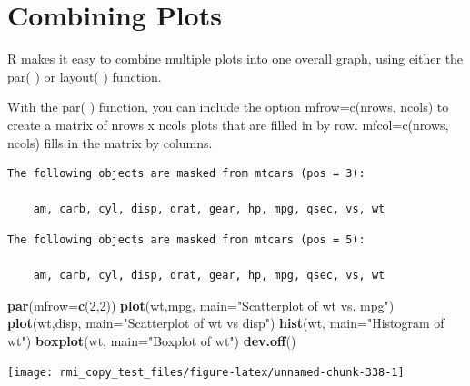 \documentclass[]{book}
\newenvironment{Shaded}{\begin{snugshade}}{\end{snugshade}}
\newcommand{\CommentTok}[1]{\textcolor[rgb]{0.56,0.35,0.01}{\textit{#1}}}
\newcommand{\DataTypeTok}[1]{\textcolor[rgb]{0.13,0.29,0.53}{#1}}
\newcommand{\DecValTok}[1]{\textcolor[rgb]{0.00,0.00,0.81}{#1}}
\newcommand{\KeywordTok}[1]{\textcolor[rgb]{0.13,0.29,0.53}{\textbf{#1}}}
\newcommand{\NormalTok}[1]{#1}
\newcommand{\StringTok}[1]{\textcolor[rgb]{0.31,0.60,0.02}{#1}}
\theoremstyle{definition}
\theoremstyle{definition}
\theoremstyle{definition}
\theoremstyle{remark}
\begin{document}
\hypertarget{combining-plots}{%
\section{Combining Plots}\label{combining-plots}}

R makes it easy to combine multiple plots into one overall graph, using
either the par( ) or layout( ) function.

With the par( ) function, you can include the option mfrow=c(nrows,
ncols) to create a matrix of nrows x ncols plots that are filled in by
row. mfcol=c(nrows, ncols) fills in the matrix by columns.

\begin{Shaded}
\end{Shaded}

\begin{verbatim}
The following objects are masked from mtcars (pos = 3):

    am, carb, cyl, disp, drat, gear, hp, mpg, qsec, vs, wt
\end{verbatim}

\begin{verbatim}
The following objects are masked from mtcars (pos = 5):

    am, carb, cyl, disp, drat, gear, hp, mpg, qsec, vs, wt
\end{verbatim}

\begin{Shaded}
\begin{Highlighting}[]
\KeywordTok{par}\NormalTok{(}\DataTypeTok{mfrow=}\KeywordTok{c}\NormalTok{(}\DecValTok{2}\NormalTok{,}\DecValTok{2}\NormalTok{))}
\KeywordTok{plot}\NormalTok{(wt,mpg, }\DataTypeTok{main=}\StringTok{"Scatterplot of wt vs. mpg"}\NormalTok{)}
\KeywordTok{plot}\NormalTok{(wt,disp, }\DataTypeTok{main=}\StringTok{"Scatterplot of wt vs disp"}\NormalTok{)}
\KeywordTok{hist}\NormalTok{(wt, }\DataTypeTok{main=}\StringTok{"Histogram of wt"}\NormalTok{)}
\KeywordTok{boxplot}\NormalTok{(wt, }\DataTypeTok{main=}\StringTok{"Boxplot of wt"}\NormalTok{)}
\KeywordTok{dev.off}\NormalTok{()}
\end{Highlighting}
\end{Shaded}

\begin{center}\texttt{[image: rmi\_copy\_test\_files/figure-latex/unnamed-chunk-338-1]} \end{center}
\end{document}
